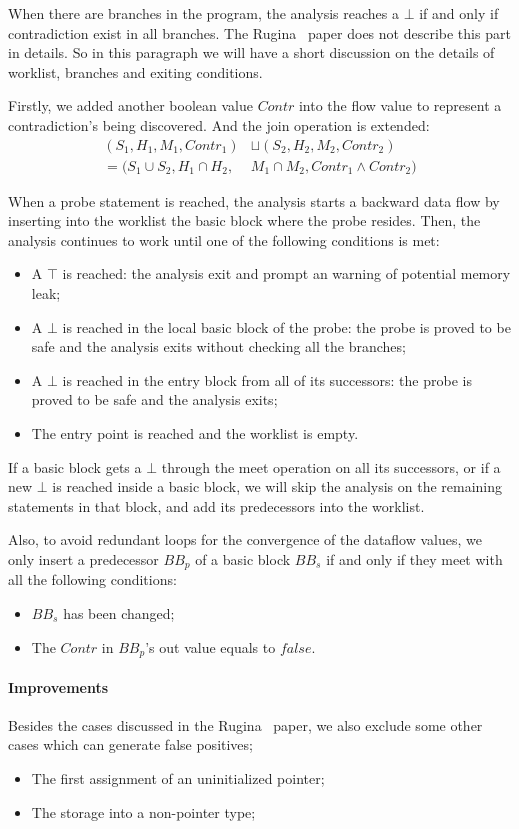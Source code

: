When there are branches in the program, the analysis reaches a $\bot$ if and only 
if contradiction exist in all branches. The Rugina~\cite{rugina} paper does not 
describe this part in details. So in this paragraph we will have a 
short discussion on the details of worklist, branches and exiting conditions.

Firstly, we added another boolean value $Contr$ into the flow value to 
represent a contradiction's being discovered. And the join operation is 
extended:
\begin{align*}
  (S_1,H_1,M_1,Contr_1) &\sqcup (S_2,H_2,M_2,Contr_2) \\
  = (S_1\cup S_2,H_1\cap H_2, & M_1\cap M_2,Contr_1\wedge Contr_2)
\end{align*}

When a probe statement is reached, the analysis starts a backward data flow 
by inserting into the worklist the basic block where 
the probe resides. Then, the analysis continues to work until one of the 
following conditions is met:
\begin{itemize}
  \item A $\top$ is reached: the analysis exit and prompt an warning of 
    potential memory leak;
  \item A $\bot$ is reached in the local basic block of the probe: 
    the probe is proved to be safe and the analysis exits without checking all 
    the branches;
  \item A $\bot$ is reached in the entry block from all of its successors:
    the probe is proved to be safe and the analysis exits;
  \item The entry point is reached and the worklist is empty.
\end{itemize}

If a basic block gets a $\bot$ through the meet operation on all its successors,
or if a new $\bot$ is reached inside a basic block, we will skip the analysis on 
the remaining statements in that block, and add its predecessors into the 
worklist.

Also, to avoid redundant loops for the convergence of the dataflow values, 
we only insert a predecessor $BB_p$ of a basic block $BB_s$ if and only if they 
meet with all the following conditions:
\begin{itemize}
  \item $BB_s$ has been changed;
  \item The $Contr$ in $BB_p$'s out value equals to $false$.
\end{itemize}


\paragraph{Improvements}

Besides the cases discussed in the Rugina~\cite{rugina} paper, we also exclude 
some other cases which can generate false positives;

\begin{itemize}
  \item The first assignment of an uninitialized pointer;
  \item The storage into a non-pointer type;
\end{itemize}
